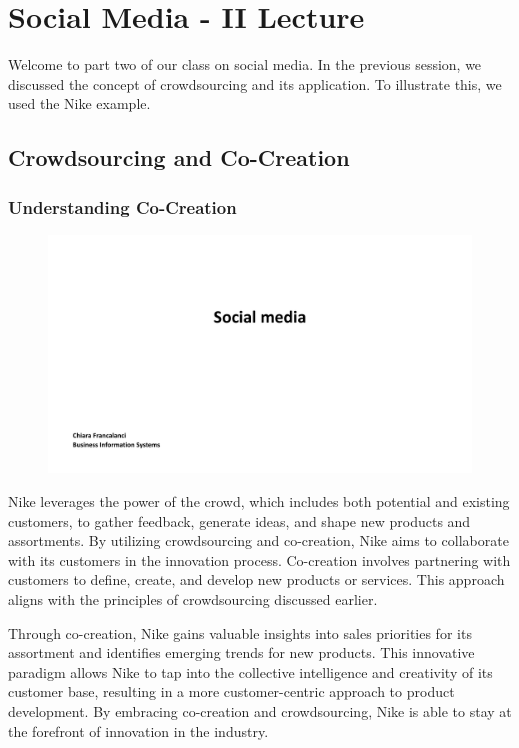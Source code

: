 \section{Social Media - II Lecture}

Welcome to part two of our class on social media. In the previous
session, we discussed the concept of crowdsourcing and its application.
To illustrate this, we used the Nike example.

\subsection{Crowdsourcing and
    Co-Creation}\label{crowdsourcing-and-co-creation}

\subsubsection{Understanding Co-Creation}\label{understanding-co-creation}

\begin{figure}[!h]
    \centering
    \includegraphics[page=11, trim = 1.5cm 3cm 2.5cm 3cm, clip, width=\textwidth]{images/04 - Social_Media.pdf}
\end{figure}

Nike leverages the power of the crowd, which includes both potential and
existing customers, to gather feedback, generate ideas, and shape new
products and assortments. By utilizing crowdsourcing and co-creation,
Nike aims to collaborate with its customers in the innovation process.
Co-creation involves partnering with customers to define, create, and
develop new products or services. This approach aligns with the
principles of crowdsourcing discussed earlier.

Through co-creation, Nike gains valuable insights into sales priorities
for its assortment and identifies emerging trends for new products. This
innovative paradigm allows Nike to tap into the collective intelligence
and creativity of its customer base, resulting in a more
customer-centric approach to product development. By embracing
co-creation and crowdsourcing, Nike is able to stay at the forefront of
innovation in the industry.

